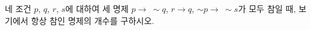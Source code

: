 네 조건 $p$, $q$, $r$, $s$에 대하여 세 명제 $p\longrightarrow\ \sim q$, $r\longrightarrow q$, $\sim p\longrightarrow\ \sim s$가 모두 참일 때, 보기에서 항상 참인 명제의 개수를 구하시오. 
